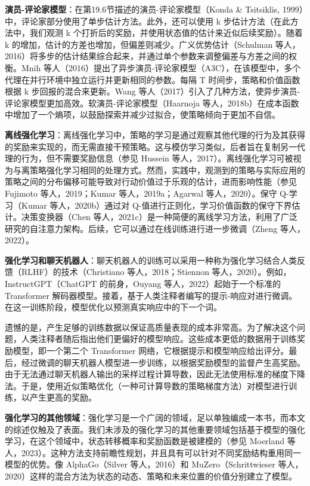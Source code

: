 \textbf{演员-评论家模型}：在第19.6节描述的演员-评论家模型（Konda \& Tsitsiklis, 1999）中，评论家部分使用了单步估计方法。此外，还可以使用 k 步估计方法（在此方法中，我们观测 k 个打折后的奖励，并使用状态值的估计来近似后续奖励）。随着 k 的增加，估计的方差也增加，但偏差则减少。广义优势估计（Schulman 等人，2016）将多步的估计结果综合起来，并通过单个参数来调整偏差与方差之间的权衡。Mnih 等人（2016）提出了异步演员-评论家模型（A3C），在该模型中，多个代理在并行环境中独立运行并更新相同的参数。每隔 T 时间步，策略和价值函数根据 k 步回报的混合来更新。Wang 等人（2017）引入了几种方法，使异步演员-评论家模型更加高效。软演员-评论家模型（Haarnoja 等人，2018b）在成本函数中增加了一个熵项，以鼓励探索并减少过拟合，使策略倾向于更加不自信。

\textbf{离线强化学习}：离线强化学习中，策略的学习是通过观察其他代理的行为及其获得的奖励来实现的，而无需直接干预策略。这与模仿学习类似，后者旨在复制另一代理的行为，但不需要奖励信息（参见 Hussein 等人，2017）。离线强化学习可被视为与离策略强化学习相同的处理方式。然而，实践中，观测到的策略与实际应用的策略之间的分布偏移可能导致对行动价值过于乐观的估计，进而影响性能（参见 Fujimoto 等人，2019；Kumar 等人，2019a；Agarwal 等人，2020）。保守 Q-学习（Kumar 等人，2020b）通过对 Q-值进行正则化，学习价值函数的保守下界估计。决策变换器（Chen 等人，2021c）是一种简便的离线学习方法，利用了广泛研究的自注意力架构。后续，它可以通过在线训练进行进一步微调（Zheng 等人，2022）。

\textbf{强化学习和聊天机器人}：聊天机器人的训练可以采用一种称为强化学习结合人类反馈（RLHF）的技术（Christiano 等人，2018；Stiennon 等人，2020）。例如，InstructGPT（ChatGPT 的前身，Ouyang 等人，2022）起始于一个标准的 Transformer 解码器模型。接着，基于人类注释者编写的提示-响应对进行微调。在这一训练阶段，模型优化以预测真实响应中的下一个词。

遗憾的是，产生足够的训练数据以保证高质量表现的成本非常高。为了解决这个问题，人类注释者随后指出他们更偏好的模型响应。这些成本更低的数据用于训练奖励模型，即一个第二个 Transformer 网络，它根据提示和模型响应给出评分。最后，经过微调的聊天机器人模型进一步训练，以根据奖励模型的监督产生高奖励。由于无法通过聊天机器人输出的采样过程计算导数，因此无法使用标准的梯度下降法。于是，使用近似策略优化（一种可计算导数的策略梯度方法）对模型进行训练，以产生更高的奖励。

\textbf{强化学习的其他领域}：强化学习是一个广阔的领域，足以单独编成一本书，而本文的综述仅触及了表面。我们未涉及的强化学习的其他重要领域包括基于模型的强化学习，在这个领域中，状态转移概率和奖励函数是被建模的（参见 Moerland 等人，2023）。这种方法支持前瞻性规划，并且具有可以针对不同奖励结构重用同一模型的优势。像 AlphaGo（Silver 等人，2016）和 MuZero（Schrittwieser 等人，2020）这样的混合方法为状态的动态、策略和未来位置的价值分别建立了模型。

